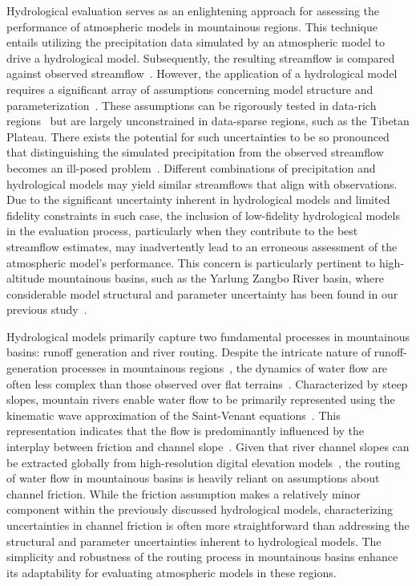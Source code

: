 \documentclass[draft]{agujournal2019}
\begin{document}
Hydrological evaluation serves as an enlightening approach for assessing the performance of atmospheric models in mountainous regions. This technique entails utilizing the precipitation data simulated by an atmospheric model to drive a hydrological model. Subsequently, the resulting streamflow is compared against observed streamflow~\cite{krier2012WRR, henn2015WRR, henn2016WRR, pang2020HESS}. However, the application of a hydrological model requires a significant array of assumptions concerning model structure and parameterization~\cite{kirchner2009WRR, henn2016WRR}. These assumptions can be rigorously tested in data-rich regions~\cite{clark2011WRR, zheng2020JAMES} but are largely unconstrained in data-sparse regions, such as the Tibetan Plateau. There exists the potential for such uncertainties to be so pronounced that distinguishing the simulated precipitation from the observed streamflow becomes an ill-posed problem~\cite{renard2010WRR}. Different combinations of precipitation and hydrological models may yield similar streamflows that align with observations. Due to the significant uncertainty inherent in hydrological models and limited fidelity constraints in such case, the inclusion of low-fidelity hydrological models in the evaluation process, particularly when they contribute to the best streamflow estimates, may inadvertently lead to an erroneous assessment of the atmospheric model's performance. This concern is particularly pertinent to high-altitude mountainous basins, such as the Yarlung Zangbo River basin, where considerable model structural and parameter uncertainty has been found in our previous study~\cite{lei2024JH}.

Hydrological models primarily capture two fundamental processes in mountainous basins: runoff generation and river routing. Despite the intricate nature of runoff-generation processes in mountainous regions~\cite{van_tiel2024NW}, the dynamics of water flow are often less complex than those observed over flat terrains~\cite{getirana2013WRR, moussa1996JH}. Characterized by steep slopes, mountain rivers enable water flow to be primarily represented using the kinematic wave approximation of the Saint-Venant equations~\cite{moussa1996JH}. This representation indicates that the flow is predominantly influenced by the interplay between friction and channel slope~\cite{getirana2013WRR, moussa1996JH}. Given that river channel slopes can be extracted globally from high-resolution digital elevation models~\cite{yamazaki2017GRL, yamazaki2019WRR}, the routing of water flow in mountainous basins is heavily reliant on assumptions about channel friction. While the friction assumption makes a relatively minor component within the previously discussed hydrological models,  characterizing uncertainties in channel friction is often more straightforward than addressing the structural and parameter uncertainties inherent to hydrological models. The simplicity and robustness of the routing process in mountainous basins enhance its adaptability for evaluating atmospheric models in these regions.
\end{document}
